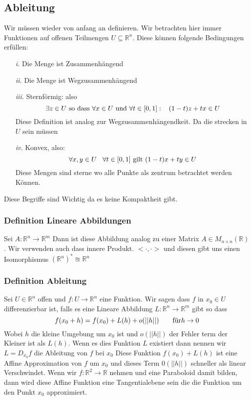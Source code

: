 \documentclass{article}
\newcommand{\mspc}{\hspace{0.7cm}}
\newcommand{\smspc}{\hspace{0.3cm}}
\newcommand{\definition}[1]{\subsubsection*{Definition {#1}}}
\begin{document}
\subsection*{Ableitung} Wir müssen wieder von anfang an definieren. Wir betrachten hier immer Funktionen auf offenen Teilmengen $U \subseteq \mathbb{R}^n$. Diese können folgende Bedingungen erfüllen:
\begin{itemize}
  \item[\textit{i.}]{Die Menge ist Zusammenhängend}
  \item[\textit{ii.}]{Die Menge ist Wegzusammenhängend}
  \item[\textit{iii.}]{Sternförmig: also \[\exists z\in U \text{ so dass } \forall x\in U \text{ und }\forall t\in[0,1]:\smspc (1-t)z+tx\in U\]Diese Definition ist analog zur Wegzusammenhängendkeit. Da die strecken in $U$ sein müssen}
  \item[\textit{iv.}]{Konvex, also: \[\forall x, y\in U\smspc \forall t\in [0,1] \text{ gilt } (1-t)x+ty\in U\] Diese Mengen sind sterne wo alle Punkte als zentrum betrachtet werden Können.}
\end{itemize}
Diese Begriffe sind Wichtig da es keine Kompaktheit gibt.
\definition{Lineare Abbildungen} Sei $A:\mathbb{R}^n \rightarrow \mathbb{R}^m$ Dann ist diese Abbildung analog zu einer Matrix $A\in M_{n \times n}(\mathbb{R})$. Wir verwenden auch dass innere Produkt. $<\cdot,\cdot>$ und diesen gibt uns einen Isomorphismus $(\mathbb{R}^n)^*\approxeq \mathbb{R}^n$
\definition{Ableitung} Sei $U\in \mathbb{R}^n$ offen und $f:U \rightarrow \mathbb{R}^n$ eine Funktion. Wir sagen dass $f$ in $x_0\in U$ differenzierbar ist, falls es eine Lineare Abbildung $L:\mathbb{R}^n \rightarrow \mathbb{R}^m$ gibt so dass \[f(x_0+h)=f(x_0)+L(h)+o(||h||)\mspc \text{für} h \rightarrow 0\]
Wobei $h$ die kleine Umgebung um $x_0$ ist und $o(||h||)$ der Fehler term der Kleiner ist als $L(h)$. Wenn es dies Funktion $L$ existiert dann nennen wir $L=D_{x_0}f$ die Ableitung von $f$ bei $x_0$
Diese Funktion $f(x_0)+L(h)$ ist eine Affine Approximation von $f$ um $x_0$ und dieses Term $0(||h||)$ schneller als linear Verschwindet. Wenn wir $f:\mathbb{R}^2 \rightarrow \mathbb{R}$ nehmen und eine Paraboloid damit bilden, dann wird diese Affine Funktion eine Tangentialebene sein die die Funktion um den Punkt $x_0$ approximiert.
\end{document}
